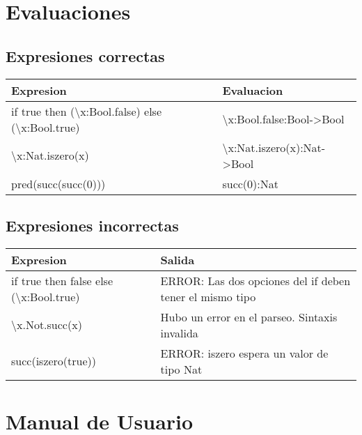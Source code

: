 \documentclass{article}
\theoremstyle{definition}
\theoremstyle{remark}
\begin{document}
\section{Evaluaciones}

\subsection{Expresiones correctas}

\begin{tabular}{|l|l|}
\hline
Expresion                                                                    & Evaluacion                                          \\ \hline
if true then (\textbackslash x:Bool.false) else (\textbackslash x:Bool.true) & \textbackslash x:Bool.false:Bool-\textgreater Bool   \\ \hline
\textbackslash x:Nat.iszero(x)                                               & \textbackslash x:Nat.iszero(x):Nat-\textgreater Bool \\ \hline
pred(succ(succ(0)))                                                          & succ(0):Nat                                         \\ \hline
\end{tabular}

\subsection{Expresiones incorrectas}

\begin{tabular}{|l|l|}
\hline
Expresion                                            & Salida                                                   \\ \hline
if true then false else (\textbackslash x:Bool.true) & ERROR: Las dos opciones del if deben tener el mismo tipo \\ \hline
\textbackslash x.Not.succ(x)                         & Hubo un error en el parseo. Sintaxis invalida            \\ \hline
succ(iszero(true))                                   & ERROR: iszero espera un valor de tipo Nat                \\ \hline
\end{tabular}

\section{Manual de Usuario}
\end{document}

